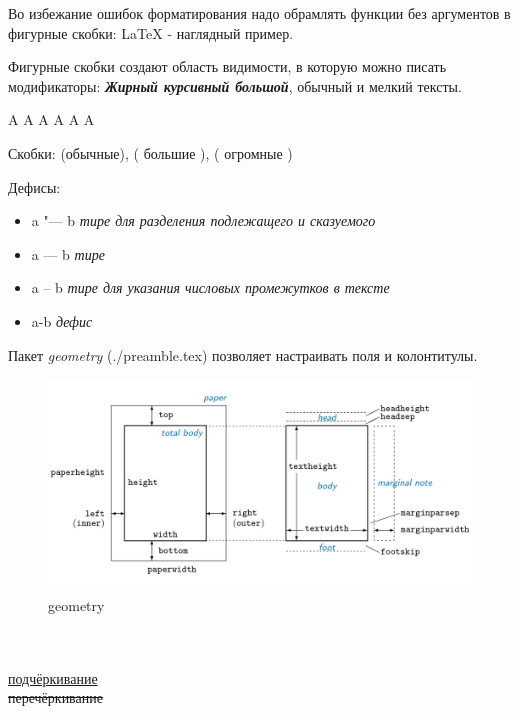 Во избежание ошибок форматирования надо обрамлять функции без аргументов в
фигурные скобки: {\LaTeX} - наглядный пример.

Фигурные скобки создают область видимости, в которую можно писать модификаторы:
{\bfseries \itshape \Large Жирный курсивный большой}, обычный и {\small
мелкий} тексты.

\Huge A
\LARGE A
\Large A
\large A
\normalsize A
\small A

Скобки: (обычные), \big( большие \big), \bigg( огромные \bigg)

Дефисы:
\begin{itemize}
  \item a "--- b \textit{тире для разделения подлежащего и сказуемого}
  \item a --- b \textit{тире}
  \item a -- b \textit{тире для указания числовых промежутков в тексте}
  \item a-b \textit{дефис}
\end{itemize}


Пакет \textit{geometry} (./preamble.tex) позволяет настраивать поля и
колонтитулы.
\begin{figure}[H]
  \centering
  \includegraphics[width=1\textwidth]{./images/geometry}
  \caption{geometry}
  \label{figure:geometry}
\end{figure}

\\
\\
\ul{подчёркивание}\\
\st{перечёркивание}

